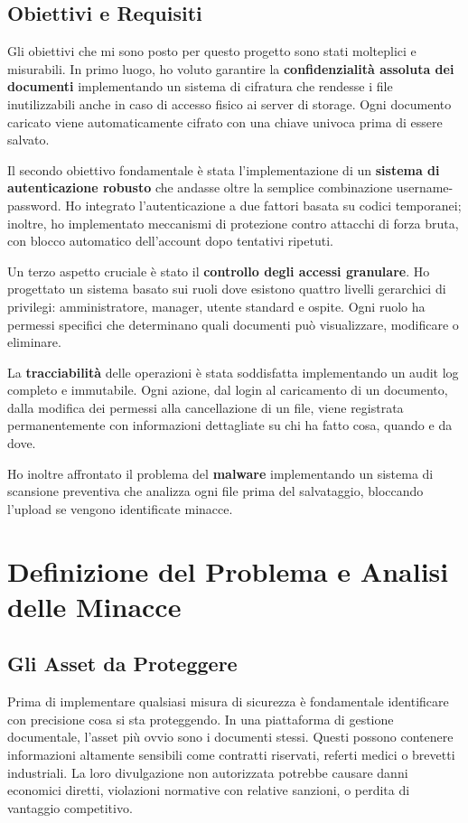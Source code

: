 \documentclass[12pt, a4paper]{article}
\begin{document}
\subsection{Obiettivi e Requisiti}

Gli obiettivi che mi sono posto per questo progetto sono stati molteplici e misurabili. In primo luogo, ho voluto garantire la \textbf{confidenzialità assoluta dei documenti} implementando un sistema di cifratura che rendesse i file inutilizzabili anche in caso di accesso fisico ai server di storage. Ogni documento caricato viene automaticamente cifrato con una chiave univoca prima di essere salvato.

Il secondo obiettivo fondamentale è stata l'implementazione di un \textbf{sistema di autenticazione robusto} che andasse oltre la semplice combinazione username-password. Ho integrato l'autenticazione a due fattori basata su codici temporanei; inoltre, ho implementato meccanismi di protezione contro attacchi di forza bruta, con blocco automatico dell'account dopo tentativi ripetuti.

Un terzo aspetto cruciale è stato il \textbf{controllo degli accessi granulare}. Ho progettato un sistema basato sui ruoli dove esistono quattro livelli gerarchici di privilegi: amministratore, manager, utente standard e ospite. Ogni ruolo ha permessi specifici che determinano quali documenti può visualizzare, modificare o eliminare.

La \textbf{tracciabilità} delle operazioni è stata soddisfatta implementando un audit log completo e immutabile. Ogni azione, dal login al caricamento di un documento, dalla modifica dei permessi alla cancellazione di un file, viene registrata permanentemente con informazioni dettagliate su chi ha fatto cosa, quando e da dove.

Ho inoltre affrontato il problema del \textbf{malware} implementando un sistema di scansione preventiva che analizza ogni file prima del salvataggio, bloccando l'upload se vengono identificate minacce.

\section{Definizione del Problema e Analisi delle Minacce}

\subsection{Gli Asset da Proteggere}

Prima di implementare qualsiasi misura di sicurezza è fondamentale identificare con precisione cosa si sta proteggendo. In una piattaforma di gestione documentale, l'asset più ovvio sono i documenti stessi. Questi possono contenere informazioni altamente sensibili come contratti riservati, referti medici o brevetti industriali. La loro divulgazione non autorizzata potrebbe causare danni economici diretti, violazioni normative con relative sanzioni, o perdita di vantaggio competitivo.
\end{document}
